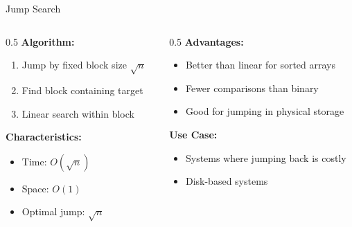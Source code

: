 \documentclass[aspectratio=169,xcolor=dvipsnames]{beamer}
\begin{document}
\begin{frame}{Jump Search}
  \begin{columns}
    \begin{column}{0.5\textwidth}
      \textbf{Algorithm:}
      \begin{enumerate}
        \item Jump by fixed block size $\sqrt{n}$
        \item Find block containing target
        \item Linear search within block
      \end{enumerate}

      \vspace{0.3cm}
      \textbf{Characteristics:}
      \begin{itemize}
        \item Time: $O(\sqrt{n})$
        \item Space: $O(1)$
        \item Optimal jump: $\sqrt{n}$
      \end{itemize}
    \end{column}

    \begin{column}{0.5\textwidth}
      \textbf{Advantages:}
      \begin{itemize}
        \item Better than linear for sorted arrays
        \item Fewer comparisons than binary
        \item Good for jumping in physical storage
      \end{itemize}

      \vspace{0.3cm}
      \textbf{Use Case:}
      \begin{itemize}
        \item Systems where jumping back is costly
        \item Disk-based systems
      \end{itemize}
    \end{column}
  \end{columns}
\end{frame}
\end{document}
